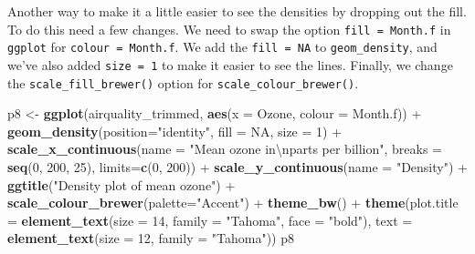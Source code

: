 \documentclass[]{article}
\newenvironment{Shaded}{\begin{snugshade}}{\end{snugshade}}
\newcommand{\KeywordTok}[1]{\textcolor[rgb]{0.13,0.29,0.53}{\textbf{{#1}}}}
\newcommand{\DataTypeTok}[1]{\textcolor[rgb]{0.13,0.29,0.53}{{#1}}}
\newcommand{\DecValTok}[1]{\textcolor[rgb]{0.00,0.00,0.81}{{#1}}}
\newcommand{\CharTok}[1]{\textcolor[rgb]{0.31,0.60,0.02}{{#1}}}
\newcommand{\StringTok}[1]{\textcolor[rgb]{0.31,0.60,0.02}{{#1}}}
\newcommand{\OtherTok}[1]{\textcolor[rgb]{0.56,0.35,0.01}{{#1}}}
\newcommand{\NormalTok}[1]{{#1}}
\begin{document}
Another way to make it a little easier to see the densities by dropping
out the fill. To do this need a few changes. We need to swap the option
\texttt{fill\ =\ Month.f} in \texttt{ggplot} for
\texttt{colour\ =\ Month.f}. We add the \texttt{fill\ =\ NA} to
\texttt{geom\_density}, and we've also added \texttt{size\ =\ 1} to make
it easier to see the lines. Finally, we change the
\texttt{scale\_fill\_brewer()} option for
\texttt{scale\_colour\_brewer()}.

\begin{Shaded}
\begin{Highlighting}[]
\NormalTok{p8 <-}\StringTok{ }\KeywordTok{ggplot}\NormalTok{(airquality_trimmed, }\KeywordTok{aes}\NormalTok{(}\DataTypeTok{x =} \NormalTok{Ozone, }\DataTypeTok{colour =} \NormalTok{Month.f)) +}\StringTok{ }
\StringTok{      }\KeywordTok{geom_density}\NormalTok{(}\DataTypeTok{position=}\StringTok{"identity"}\NormalTok{, }\DataTypeTok{fill =} \OtherTok{NA}\NormalTok{, }\DataTypeTok{size =} \DecValTok{1}\NormalTok{) +}
\StringTok{      }\KeywordTok{scale_x_continuous}\NormalTok{(}\DataTypeTok{name =} \StringTok{"Mean ozone in}\CharTok{\textbackslash{}n}\StringTok{parts per billion"}\NormalTok{,}
                         \DataTypeTok{breaks =} \KeywordTok{seq}\NormalTok{(}\DecValTok{0}\NormalTok{, }\DecValTok{200}\NormalTok{, }\DecValTok{25}\NormalTok{),}
                         \DataTypeTok{limits=}\KeywordTok{c}\NormalTok{(}\DecValTok{0}\NormalTok{, }\DecValTok{200}\NormalTok{)) +}
\StringTok{      }\KeywordTok{scale_y_continuous}\NormalTok{(}\DataTypeTok{name =} \StringTok{"Density"}\NormalTok{) +}
\StringTok{      }\KeywordTok{ggtitle}\NormalTok{(}\StringTok{"Density plot of mean ozone"}\NormalTok{) +}
\StringTok{      }\KeywordTok{scale_colour_brewer}\NormalTok{(}\DataTypeTok{palette=}\StringTok{"Accent"}\NormalTok{) +}
\StringTok{      }\KeywordTok{theme_bw}\NormalTok{() +}
\StringTok{      }\KeywordTok{theme}\NormalTok{(}\DataTypeTok{plot.title =} \KeywordTok{element_text}\NormalTok{(}\DataTypeTok{size =} \DecValTok{14}\NormalTok{, }\DataTypeTok{family =} \StringTok{"Tahoma"}\NormalTok{, }\DataTypeTok{face =} \StringTok{"bold"}\NormalTok{), }
            \DataTypeTok{text =} \KeywordTok{element_text}\NormalTok{(}\DataTypeTok{size =} \DecValTok{12}\NormalTok{, }\DataTypeTok{family =} \StringTok{"Tahoma"}\NormalTok{))}
\NormalTok{p8}
\end{Highlighting}
\end{Shaded}
\end{document}
